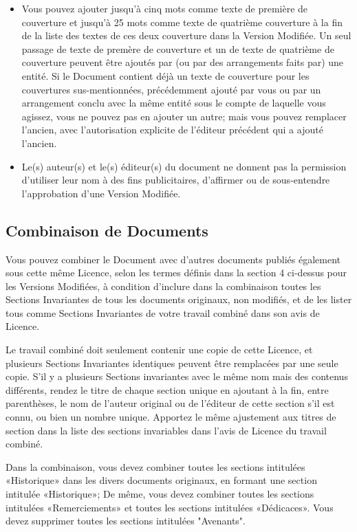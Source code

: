 \begin{itemize}
		\item Vous pouvez ajouter jusqu'à cinq mots comme texte de première de couverture et jusqu'à 25 mots comme texte de quatrième couverture à la fin de la liste des textes de ces deux couverture dans la Version Modifiée. Un seul passage de texte de premère de couverture et un de texte de quatrième de couverture peuvent être ajoutés par (ou par des arrangements faits par) une entité. Si le Document contient déjà un texte de couverture pour les couvertures sus-mentionnées, précédemment ajouté par vous ou par un arrangement conclu avec la même entité sous le compte de laquelle vous agissez, vous ne pouvez pas en ajouter un autre; mais vous pouvez remplacer l'ancien, avec l'autorisation explicite de l'éditeur précédent qui a ajouté l'ancien.

		\item Le(s) auteur(s) et le(s) éditeur(s) du document ne donnent pas la permission d'utiliser leur nom à des fins publicitaires, d'affirmer ou de sous-entendre l'approbation d'une Version Modifiée.
	\end{itemize} 

	\subsection{Combinaison de Documents}
	Vous pouvez combiner le Document avec d'autres documents publiés également sous cette même Licence, selon les termes définis dans la section 4 ci-dessus pour les Versions Modifiées, à condition d'inclure dans la combinaison toutes les Sections Invariantes de tous les documents originaux, non modifiés, et de les lister tous comme Sections Invariantes de votre travail combiné dans son avis de Licence.

	Le travail combiné doit seulement contenir une copie de cette Licence, et plusieurs Sections Invariantes identiques peuvent être remplacées par une seule copie. S'il y a plusieurs Sections invariantes avec le même nom mais des contenus différents, rendez le titre de chaque section unique en ajoutant à la fin, entre parenthèses, le nom de l'auteur original ou de l'éditeur de cette section s'il est connu, ou bien un nombre unique. Apportez le même ajustement aux titres de section dans la liste des sections invariables dans l'avis de Licence du travail combiné.
	
	Dans la combinaison, vous devez combiner toutes les sections intitulées «Historique» dans les divers documents originaux, en formant une section intitulée «Historique»; De même, vous devez combiner toutes les sections intitulées «Remerciements» et toutes les sections intitulées «Dédicaces». Vous devez supprimer toutes les sections intitulées "Avenants".

